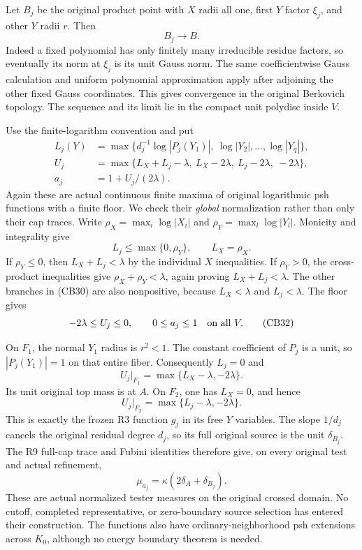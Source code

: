 Let $B_j$ be the original product point with $X$ radii all
one, first $Y$ factor $\xi_j$, and other $Y$ radii $r$.
Then
\[
                            B_j\longrightarrow B.
 \tag{CB29}
\]
Indeed a fixed polynomial has only finitely many irreducible
residue factors, so eventually its norm at $\xi_j$ is its
unit Gauss norm. The same coefficientwise Gauss calculation
and uniform polynomial approximation apply after adjoining the
other fixed Gauss coordinates. This gives convergence in the
original Berkovich topology. The sequence and its limit lie
in the compact unit polydisc inside $V$.

Use the finite-logarithm convention and put
\[
 \begin{split}
 L_j(Y)&=\max\{d_j^{-1}\log|P_j(Y_1)|,\
                       \log|Y_2|,\ldots,\log|Y_q|\},\\
 U_j&=\max\{L_X+L_j-\lambda,\
              L_X-2\lambda,\ L_j-2\lambda,\ -2\lambda\},\\
 a_j&=1+U_j/(2\lambda).
 \end{split}
 \tag{CB30}
\]
Again these are actual continuous finite maxima of original
logarithmic psh functions with a finite floor. We check their
\emph{global} normalization rather than only their cap traces.
Write $\rho_X=\max_i\log|X_i|$ and
$\rho_Y=\max_l\log|Y_l|$. Monicity and integrality give
\[
                    L_j\le\max\{0,\rho_Y\},\qquad L_X=\rho_X.
 \tag{CB31}
\]
If $\rho_Y\le0$, then $L_X+L_j<\lambda$ by the individual
$X$ inequalities. If $\rho_Y>0$, the cross-product inequalities
give $\rho_X+\rho_Y<\lambda$, again proving
$L_X+L_j<\lambda$. The other branches in (CB30) are also
nonpositive, because $L_X<\lambda$ and $L_j<\lambda$.
The floor gives
\[
                              -2\lambda\le U_j\le0,
                   \qquad 0\le a_j\le1 \quad\hbox{on all }V.
 \tag{CB32}
\]

On $F_1$, the normal $Y_1$ radius is $r^2<1$. The constant
coefficient of $P_j$ is a unit, so $|P_j(Y_1)|=1$ on that
entire fiber. Consequently $L_j=0$ and
\[
                 U_j|_{F_1}
                    =\max\{L_X-\lambda,-2\lambda\}.
 \tag{CB33}
\]
Its unit original top mass is at $A$. On $F_2$, one has
$L_X=0$, and hence
\[
                 U_j|_{F_2}
                     =\max\{L_j-\lambda,-2\lambda\}.
 \tag{CB34}
\]
This is exactly the frozen R3 function $g_j$ in its free
$Y$ variables. The slope $1/d_j$ cancels the original residual
degree $d_j$, so its full original source is the unit
$\delta_{B_j}$. The R9 full-cap trace and Fubini identities
therefore give, on every original test and actual refinement,
\[
                       \mu_{a_j}
                           =\kappa(2\delta_A+\delta_{B_j}).
 \tag{CB35}
\]
These are actual normalized tester measures on the original
crossed domain. No cutoff, completed representative, or
zero-boundary source selection has entered their construction.
The functions also have ordinary-neighborhood psh extensions
across $K_0$, although no energy boundary theorem is needed.

